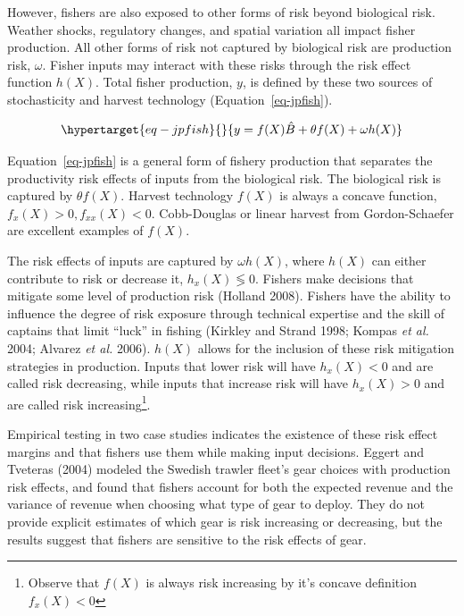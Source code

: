 \documentclass[
  letterpaper,
  DIV=11,
  numbers=noendperiod]{scrartcl}
\theoremstyle{plain}
\theoremstyle{plain}
\theoremstyle{remark}
\begin{document}
However, fishers are also exposed to other forms of risk beyond
biological risk. Weather shocks, regulatory changes, and spatial
variation all impact fisher production. All other forms of risk not
captured by biological risk are production risk, \(\omega\). Fisher
inputs may interact with these risks through the risk effect function
\(h(X)\). Total fisher production, \(y\), is defined by these two
sources of stochasticity and harvest technology
(Equation~\ref{eq-jpfish}).

\begin{equation}\protect\hypertarget{eq-jpfish}{}{
y=f(X)\hat{B}+\theta f(X)+\omega h(X)
}\label{eq-jpfish}\end{equation}

Equation~\ref{eq-jpfish} is a general form of fishery production that
separates the productivity risk effects of inputs from the biological
risk. The biological risk is captured by \(\theta f(X)\). Harvest
technology \(f(X)\) is always a concave function,
\(f_x(X)>0,f_{xx}(X)<0\). Cobb-Douglas or linear harvest from
Gordon-Schaefer are excellent examples of \(f(X)\).

The risk effects of inputs are captured by \(\omega h(X)\), where
\(h(X)\) can either contribute to risk or decrease it,
\(h_x(X)\lessgtr0\). Fishers make decisions that mitigate some level of
production risk (Holland 2008). Fishers have the ability to influence
the degree of risk exposure through technical expertise and the skill of
captains that limit ``luck'' in fishing (Kirkley and Strand 1998; Kompas
\emph{et al.} 2004; Alvarez \emph{et al.} 2006). \(h(X)\) allows for the
inclusion of these risk mitigation strategies in production. Inputs that
lower risk will have \(h_x(X)<0\) and are called risk decreasing, while
inputs that increase risk will have \(h_x(X)>0\) and are called risk
increasing\footnote{Observe that \(f(X)\) is always risk increasing by
  it's concave definition \(f_x(X)<0\)}.

Empirical testing in two case studies indicates the existence of these
risk effect margins and that fishers use them while making input
decisions. Eggert and Tveteras (2004) modeled the Swedish trawler
fleet's gear choices with production risk effects, and found that
fishers account for both the expected revenue and the variance of
revenue when choosing what type of gear to deploy. They do not provide
explicit estimates of which gear is risk increasing or decreasing, but
the results suggest that fishers are sensitive to the risk effects of
gear.
\end{document}
